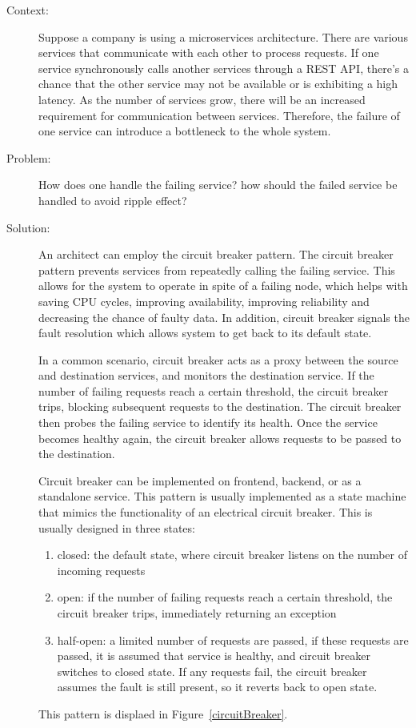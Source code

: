 \documentclass{bmcart}
\begin{document}
\begin{description}
  \item[Context:] Suppose a company is using a microservices architecture. There are various services that communicate with each other to process requests. If one service synchronously calls another services through a REST API, there's a chance that the other service may not be available or is exhibiting a high latency. As the number of services grow, there will be an increased requirement for communication between services. Therefore, the failure of one service can introduce a bottleneck to the whole system.
  \item[Problem:] How does one handle the failing service? how should the failed service be handled to avoid ripple effect? 
  \item[Solution:] An architect can employ the circuit breaker pattern. The circuit breaker pattern prevents services from repeatedly calling the failing service. This allows for the system to operate in spite of a failing node, which helps with saving CPU cycles, improving availability, improving reliability and decreasing the chance of faulty data. In addition, circuit breaker signals the fault resolution which allows system to get back to its default state. 

  In a common scenario, circuit breaker acts as a proxy between the source and destination services, and monitors the destination service. If the number of failing requests reach a certain threshold, the circuit breaker trips, blocking subsequent requests to the destination. The circuit breaker then probes the failing service to identify its health. Once the service becomes healthy again, the circuit breaker allows requests to be passed to the destination. 
  
  Circuit breaker can be implemented on frontend, backend, or as a standalone service. This pattern is usually implemented as a state machine that mimics the functionality of an electrical circuit breaker. This is usually designed in three states: 
  \begin{enumerate}
    \item closed: the default state, where circuit breaker listens on the number of incoming requests
    \item open: if the number of failing requests reach a certain threshold, the circuit breaker trips, immediately returning an exception
    \item half-open: a limited number of requests are passed, if these requests are passed, it is assumed that service is healthy, and circuit breaker switches to closed state. If any requests fail, the circuit breaker assumes the fault is still present, so it reverts back to open state.
  \end{enumerate}
  
  This pattern is displaed in Figure~\ref{circuitBreaker}.   
\end{description}
\end{document}
